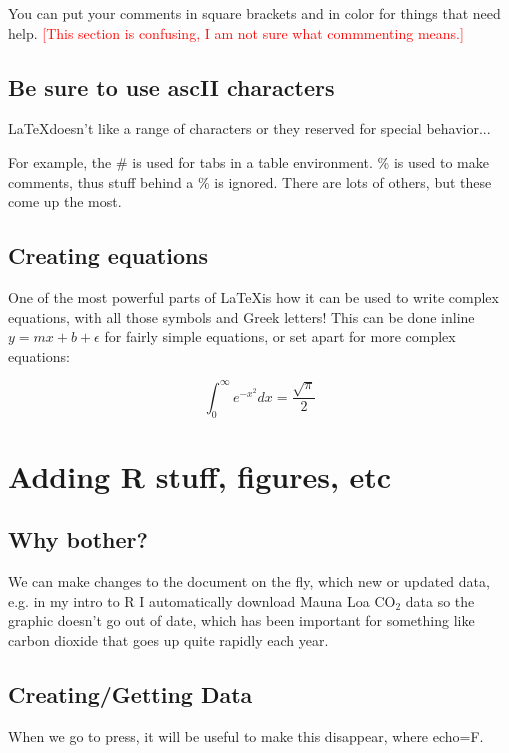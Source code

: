 You can put your comments in square brackets and in color for things that need help. \textcolor{red}{[This section is confusing, I am not sure what commmenting means.]}

\subsection{Be sure to use ascII characters}

\LaTeX doesn't like a range of characters or they reserved for special behavior...

For example, the \# is used for tabs in a table environment. \% is used to make comments, thus stuff behind a \% is ignored. There are lots of others, but these come up the most.

\subsection{Creating equations}

One of the most powerful parts of \LaTeX is how it can be used to write complex equations, with all those symbols and Greek letters! This can be done inline $y = mx + b + \epsilon$ for fairly simple equations, or set apart for more complex equations:

\begin{equation}
\int_0^\infty e^{-x^2} dx=\frac{\sqrt{\pi}}{2}
\end{equation}

\section{Adding R stuff, figures, etc}

\subsection{Why bother?}

We can make changes to the document on the fly, which new or updated data, e.g. in my intro to R I automatically download Mauna Loa CO$_2$ data so the graphic doesn't go out of date, which has been important for something like carbon dioxide that goes up quite rapidly each year.

\subsection{Creating/Getting Data}

When we go to press, it will be useful to make this disappear, where echo=F.

